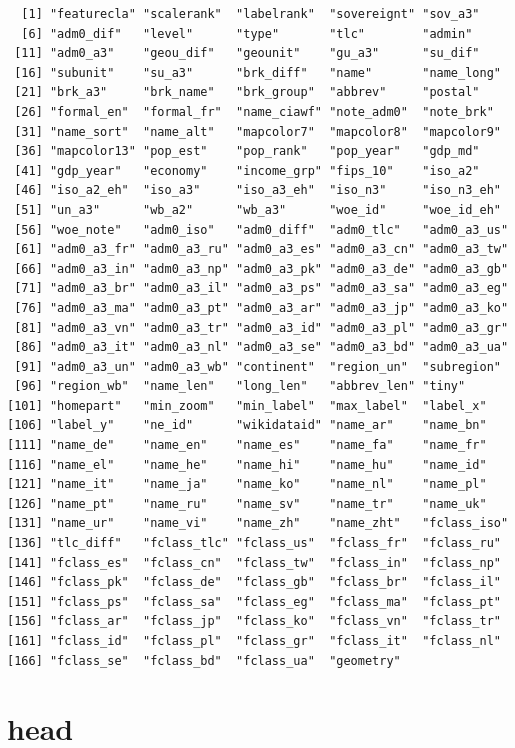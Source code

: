 \documentclass[
  letterpaper,
  DIV=11,
  numbers=noendperiod,
  oneside]{scrreprt}
\begin{document}
\begin{verbatim}
  [1] "featurecla" "scalerank"  "labelrank"  "sovereignt" "sov_a3"    
  [6] "adm0_dif"   "level"      "type"       "tlc"        "admin"     
 [11] "adm0_a3"    "geou_dif"   "geounit"    "gu_a3"      "su_dif"    
 [16] "subunit"    "su_a3"      "brk_diff"   "name"       "name_long" 
 [21] "brk_a3"     "brk_name"   "brk_group"  "abbrev"     "postal"    
 [26] "formal_en"  "formal_fr"  "name_ciawf" "note_adm0"  "note_brk"  
 [31] "name_sort"  "name_alt"   "mapcolor7"  "mapcolor8"  "mapcolor9" 
 [36] "mapcolor13" "pop_est"    "pop_rank"   "pop_year"   "gdp_md"    
 [41] "gdp_year"   "economy"    "income_grp" "fips_10"    "iso_a2"    
 [46] "iso_a2_eh"  "iso_a3"     "iso_a3_eh"  "iso_n3"     "iso_n3_eh" 
 [51] "un_a3"      "wb_a2"      "wb_a3"      "woe_id"     "woe_id_eh" 
 [56] "woe_note"   "adm0_iso"   "adm0_diff"  "adm0_tlc"   "adm0_a3_us"
 [61] "adm0_a3_fr" "adm0_a3_ru" "adm0_a3_es" "adm0_a3_cn" "adm0_a3_tw"
 [66] "adm0_a3_in" "adm0_a3_np" "adm0_a3_pk" "adm0_a3_de" "adm0_a3_gb"
 [71] "adm0_a3_br" "adm0_a3_il" "adm0_a3_ps" "adm0_a3_sa" "adm0_a3_eg"
 [76] "adm0_a3_ma" "adm0_a3_pt" "adm0_a3_ar" "adm0_a3_jp" "adm0_a3_ko"
 [81] "adm0_a3_vn" "adm0_a3_tr" "adm0_a3_id" "adm0_a3_pl" "adm0_a3_gr"
 [86] "adm0_a3_it" "adm0_a3_nl" "adm0_a3_se" "adm0_a3_bd" "adm0_a3_ua"
 [91] "adm0_a3_un" "adm0_a3_wb" "continent"  "region_un"  "subregion" 
 [96] "region_wb"  "name_len"   "long_len"   "abbrev_len" "tiny"      
[101] "homepart"   "min_zoom"   "min_label"  "max_label"  "label_x"   
[106] "label_y"    "ne_id"      "wikidataid" "name_ar"    "name_bn"   
[111] "name_de"    "name_en"    "name_es"    "name_fa"    "name_fr"   
[116] "name_el"    "name_he"    "name_hi"    "name_hu"    "name_id"   
[121] "name_it"    "name_ja"    "name_ko"    "name_nl"    "name_pl"   
[126] "name_pt"    "name_ru"    "name_sv"    "name_tr"    "name_uk"   
[131] "name_ur"    "name_vi"    "name_zh"    "name_zht"   "fclass_iso"
[136] "tlc_diff"   "fclass_tlc" "fclass_us"  "fclass_fr"  "fclass_ru" 
[141] "fclass_es"  "fclass_cn"  "fclass_tw"  "fclass_in"  "fclass_np" 
[146] "fclass_pk"  "fclass_de"  "fclass_gb"  "fclass_br"  "fclass_il" 
[151] "fclass_ps"  "fclass_sa"  "fclass_eg"  "fclass_ma"  "fclass_pt" 
[156] "fclass_ar"  "fclass_jp"  "fclass_ko"  "fclass_vn"  "fclass_tr" 
[161] "fclass_id"  "fclass_pl"  "fclass_gr"  "fclass_it"  "fclass_nl" 
[166] "fclass_se"  "fclass_bd"  "fclass_ua"  "geometry"  
\end{verbatim}

\section{head}\label{head}
\end{document}
